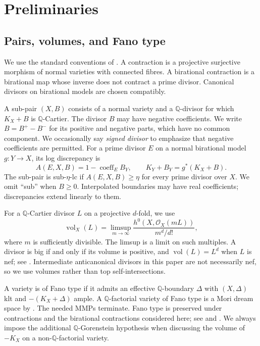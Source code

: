 \documentclass[11pt,reqno]{amsart}
\numberwithin{equation}{section}
\theoremstyle{definition}
\theoremstyle{remark}
\newcommand{\Q}{\mathbb Q}
\newcommand{\OO}{\mathcal O}
\newcommand{\vol}{\operatorname{vol}}
\newcommand{\coef}{\operatorname{coeff}}
\begin{document}
\section{Preliminaries}\label{sec:prelim}

\subsection{Pairs, volumes, and Fano type}
We use the standard conventions of \cite{KM98}. A contraction is a projective surjective morphism of normal varieties with connected fibres. A birational contraction is a birational map whose inverse does not contract a prime divisor. Canonical divisors on birational models are chosen compatibly.

A sub-pair $(X,B)$ consists of a normal variety and a $\Q$-divisor for which $K_X+B$ is $\Q$-Cartier. The divisor $B$ may have negative coefficients. We write $B=B^+-B^-$ for its positive and negative parts, which have no common component. We occasionally say \emph{signed divisor} to emphasize that negative coefficients are permitted. For a prime divisor $E$ on a normal birational model $g:Y\to X$, its log discrepancy is
\[
 A(E,X,B)=1-\coef_E B_Y,
 \qquad K_Y+B_Y=g^*(K_X+B).
\]
The sub-pair is sub-$\eta$-lc if $A(E,X,B)\ge\eta$ for every prime divisor over $X$. We omit ``sub'' when $B\ge0$. Interpolated boundaries may have real coefficients; discrepancies extend linearly to them.

For a $\Q$-Cartier divisor $L$ on a projective $d$-fold, we use
\[
 \vol_X(L)=\limsup_{m\to\infty}
 \frac{h^0(X,\OO_X(mL))}{m^d/d!},
\]
where $m$ is sufficiently divisible. The limsup is a limit on such multiples. A divisor is big if and only if its volume is positive, and $\vol(L)=L^d$ when $L$ is nef; see \cite[Section~2.2]{Laz04}. Intermediate anticanonical divisors in this paper are not necessarily nef, so we use volumes rather than top self-intersections.

A variety is of Fano type if it admits an effective $\Q$-boundary $\Delta$ with $(X,\Delta)$ klt and $-(K_X+\Delta)$ ample. A $\Q$-factorial variety of Fano type is a Mori dream space by \cite[Corollary~1.3.2]{BCHM}. The needed MMPs terminate. Fano type is preserved under contractions and the birational contractions considered here; see \cite[Theorem~1.1 and Corollary~1.3]{GOST} and \cite[Section~2]{MM}. We always impose the additional $\Q$-Gorenstein hypothesis when discussing the volume of $-K_X$ on a non-$\Q$-factorial variety.
\end{document}

